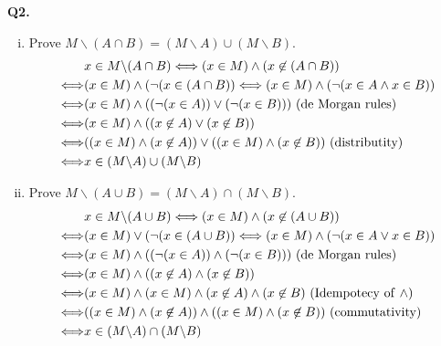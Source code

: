 \documentclass{article}[12pt]
\begin{document}
\noindent \textbf{Q2.}
\begin{enumerate}[(i)]
\item Prove $M \backslash(A \cap B)=(M \backslash A) \cup(M \backslash B)$.
\begin{align*}
&x\in M \backslash(A \cap B) \Longleftrightarrow (x\in M)\wedge (x \not\in (A \cap B))\\\Longleftrightarrow &(x\in M)\wedge (\neg(x \in  (A \cap B)) 
\Longleftrightarrow (x\in M)\wedge (\neg(x \in A \wedge x\in B))\\
 \Longleftrightarrow &(x\in M)\wedge ((\neg( x\in A))\vee (\neg (x\in B))) \rm{\ (de\ Morgan\ rules)}
 \\
\Longleftrightarrow & (x\in M)\wedge (( x\not\in A)\vee (x\not\in B))\\
\Longleftrightarrow &((x\in M)\wedge (x\not\in A))\vee((x\in M)\wedge (x\not\in B)) \rm{\ (distributity)}\\
\Longleftrightarrow &x\in (M \backslash A) \cup(M \backslash B)
\end{align*}

\item Prove $M \backslash(A \cup B)=(M \backslash A) \cap(M \backslash B)$.
\begin{align*}
&x\in M \backslash(A \cup B) \Longleftrightarrow (x\in M)\wedge (x \not\in (A \cup B))\\\Longleftrightarrow &(x\in M)\vee (\neg(x \in  (A \cup B)) 
\Longleftrightarrow (x\in M)\wedge (\neg(x \in A \vee x\in B)) \\
\Longleftrightarrow &(x\in M)\wedge ((\neg( x\in A))\wedge (\neg (x\in B)))\rm{\ (de\ Morgan\ rules)}
\\
\Longleftrightarrow & (x\in M)\wedge (( x\not\in A)\wedge (x\not\in B))\\ \Longleftrightarrow &(x\in M)\wedge(x\in M)\wedge ( x\not\in A)\wedge (x\not\in B)\rm{\ (Idempotecy \ of \ \wedge)}\\
\Longleftrightarrow &((x\in M)\wedge (x\not\in A))\wedge((x\in M)\wedge (x\not\in B))\rm{\ (commutativity)}\\
\Longleftrightarrow &x\in (M \backslash A) \cap(M \backslash B)
\end{align*}
\end{enumerate}
\end{document}
